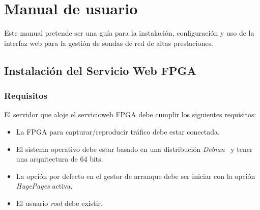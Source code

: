 \chapter{Manual de usuario\label{extra:manual_de_usuario}}

Este manual pretende ser una guía para la instalación, configuración y uso de la interfaz web para la gestión de sondas de red de altas prestaciones.

\section{Instalación del Servicio Web FPGA\label{extra:manual:instalacionfpga}}

\subsection*{Requisitos}
El servidor que aloje el \gls{servicioweb} \gls{FPGA} debe cumplir los siguientes requisitos:
\begin{itemize}
  \item La \gls{FPGA} para capturar/reproducir tráfico debe estar conectada.
  \item El sistema operativo debe estar basado en una distribución \textit{Debian}~\cite{debian} y tener una arquitectura de 64 bits.
  \item La opción por defecto en el gestor de arranque debe ser iniciar con la opción \textit{HugePages} activa.
  \item El usuario \textit{root} debe existir.
\end{itemize}

